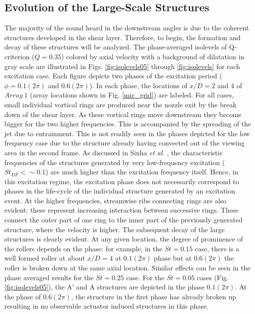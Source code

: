 \documentclass[english]{aiaa-tc}
\begin{document}
\subsection{Evolution of the Large-Scale Structures}\label{structure}
The majority of the sound heard in the downstream angles is due to the coherent structures developed in the shear layer. Therefore, to begin, the formation and decay of these structures will be analyzed. The phase-averaged isolevels of Q-criterion ($Q=0.35$) colored by axial velocity with a background of dilatation in gray scale are illustrated in Figs. \ref{fig:isolevels05} through \ref{fig:isolevels} for each excitation case. Each figure depicts two phases of the excitation period ($\phi =0.1(2\pi)$ and $0.6(2\pi)$). In each phase, the locations of $x/D=2$ and $4$ of $Array~1$ (array locations shown in Fig. \ref{mic_grid}) are labeled.
For all cases, small individual vortical rings are produced near the
nozzle exit by the break down of the shear layer. As these vortical
rings move downstream they become bigger for the two higher
frequencies.  This is accompanied by the spreading of the jet due to
entrainment.  This is not readily seen in the phases depicted for the low frequency case due to the structure already having convected out of the viewing area in the second frame.
As discussed in Sinha \emph{et al.} \cite{sinha2013}, the characteristic frequencies of the structures generated by very low-frequency excitation ($St_{DF} < \sim 0.1$) are much higher than the excitation frequency itself.
Hence, in this excitation regime, the excitation phase does not necessarily correspond to phases in the life-cycle of the individual structure generated by an excitation event.
At the higher frequencies, streamwise ribs connecting
rings are also evident\cite{gdv2011-POF}: these represent
increasing interaction between successive rings.  These connect the
outer part of one ring to the inner part of the previously generated
structure, where the velocity is higher.  The subsequent decay of
the large structures is clearly evident.  At any given location, the
degree of prominence of the rollers depends on the phase: for example,
in the $St=0.15$ case, there is a well formed roller at about $x/D=4$ at
$0.1(2\pi)$ phase but at $0.6(2\pi)$ the roller is broken
down at the same axial location.  Similar effects can be seen in the
phase averaged results for the $St=0.25$ case.
For the $St=0.05$ cases (Fig. \ref{fig:isolevels05}), the A' and A structures are depicted in the phase $0.1(2\pi)$. At the phase of $0.6(2\pi)$, the structure in the first phase has already broken up resulting in no observable actuator induced structures in this phase.
\end{document}
